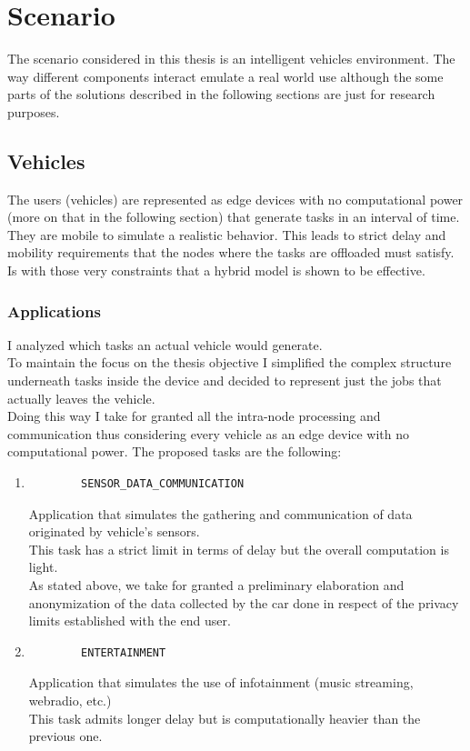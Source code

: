 \documentclass[12pt]{report}
\begin{document}
\chapter{Scenario}
The scenario considered in this thesis is an intelligent vehicles environment. The way different components interact emulate a real world use although the some parts of the solutions described in the following sections are just for research purposes.

\section{Vehicles}
The users (vehicles) are represented as edge devices with no computational power (more on that in the following section) that generate tasks in an interval of time.\\
They are mobile to simulate a realistic behavior.
This leads to strict delay and mobility requirements that the nodes where the tasks are offloaded must satisfy.\\
Is with those very constraints that a hybrid model is shown to be effective.

\subsection{Applications}
I analyzed which tasks an actual vehicle would generate.\\
To maintain the focus on the thesis objective I simplified the complex structure underneath tasks inside the device and decided to represent just the jobs that actually leaves the vehicle.\\
Doing this way I take for granted all the intra-node processing and communication thus considering every vehicle as an edge device with no computational power.
The proposed tasks are the following:
\begin{enumerate}
\item
	\begin{verbatim}
		SENSOR_DATA_COMMUNICATION
	\end{verbatim}
	Application that simulates the gathering and communication of data originated by vehicle's sensors.\\
	This task has a strict limit in terms of delay but the overall computation is light.\\
	As stated above, we take for granted a preliminary elaboration and anonymization of the data collected by the car done in respect of the privacy limits established with the end user.
	\item
	\begin{verbatim}
		ENTERTAINMENT
	\end{verbatim}
	Application that simulates the use of infotainment (music streaming, webradio, etc.)\\
	This task admits longer delay but is computationally heavier than the previous one. 
\end{enumerate}
\end{document}
